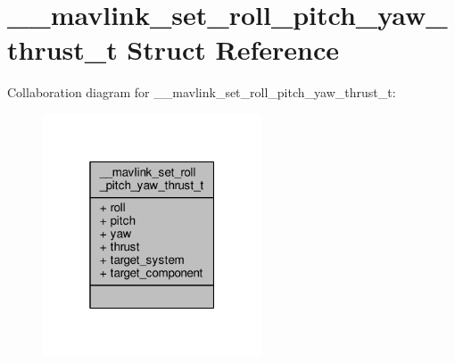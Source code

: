 \hypertarget{struct____mavlink__set__roll__pitch__yaw__thrust__t}{\section{\+\_\+\+\_\+mavlink\+\_\+set\+\_\+roll\+\_\+pitch\+\_\+yaw\+\_\+thrust\+\_\+t Struct Reference}
\label{struct____mavlink__set__roll__pitch__yaw__thrust__t}
}


Collaboration diagram for \+\_\+\+\_\+mavlink\+\_\+set\+\_\+roll\+\_\+pitch\+\_\+yaw\+\_\+thrust\+\_\+t\+:
\nopagebreak
\begin{figure}[H]
\begin{center}
\leavevmode
\includegraphics[width=184pt]{struct____mavlink__set__roll__pitch__yaw__thrust__t__coll__graph}
\end{center}
\end{figure}
